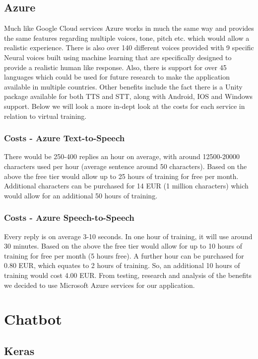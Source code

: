 \subsection{Azure}
Much like Google Cloud services Azure works in much the same way and provides the same features regarding multiple voices, tone, pitch etc. which would allow a realistic experience. There is also over 140 different voices provided with 9 specific Neural voices built using machine learning that are specifically designed to provide a realistic human like response. Also, there is support for over 45 languages which could be used for future research to make the application available in multiple countries. Other benefits include the fact there is a Unity package available for both TTS and STT, along with Android, IOS and Windows support. Below we will look a more in-dept look at the costs for each service in relation to virtual training.

\subsubsection{Costs - Azure Text-to-Speech}
There would be 250-400 replies an hour on average, with around 12500-20000 characters used per hour (average sentence around 50 characters). Based on the above the free tier would allow up to 25 hours of training for free per month. Additional characters can be purchased for 14 EUR (1 million characters) which would allow for an additional 50 hours of training.

\subsubsection{Costs - Azure Speech-to-Speech}
Every reply is on average 3-10 seconds. In one hour of training, it will use around 30 minutes. Based on the above the free tier would allow for up to 10 hours of training for free per month (5 hours free). A further hour can be purchased for 0.80 EUR, which equates to 2 hours of training. So, an additional 10 hours of training would cost 4.00 EUR.
\newline\newline
From testing, research and analysis of the benefits we decided to use Microsoft Azure services for our application.

\section{Chatbot}
\subsection{Keras}
